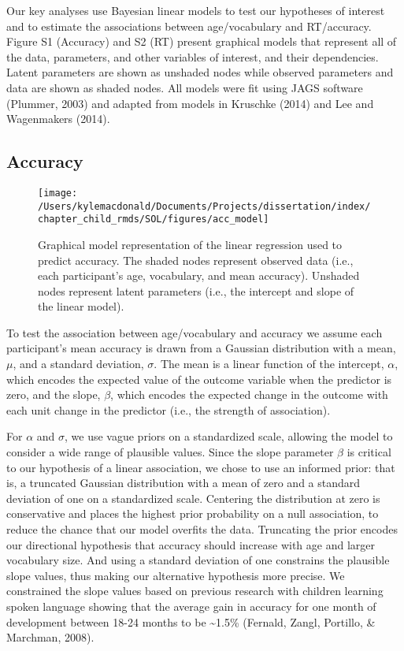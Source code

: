 \documentclass[oneside]{report}
\begin{document}
Our key analyses use Bayesian linear models to test our hypotheses of
interest and to estimate the associations between age/vocabulary and
RT/accuracy. Figure S1 (Accuracy) and S2 (RT) present graphical models
that represent all of the data, parameters, and other variables of
interest, and their dependencies. Latent parameters are shown as
unshaded nodes while observed parameters and data are shown as shaded
nodes. All models were fit using JAGS software (Plummer, 2003) and
adapted from models in Kruschke (2014) and Lee and Wagenmakers (2014).

\subsection{Accuracy}\label{accuracy}
\begin{figure}[!t]

{\centering \texttt{[image: /Users/kylemacdonald/Documents/Projects/dissertation/index/chapter\_child\_rmds/SOL/figures/acc\_model]} 

}

\caption[Graphical representation of the accuracy model in Experiment 1.1.]{Graphical model representation of the linear regression used to predict accuracy. The shaded nodes represent observed data (i.e., each participant's age, vocabulary, and mean accuracy). Unshaded nodes represent latent parameters (i.e., the intercept and slope of the linear model).}\label{fig:unnamed-chunk-8}
\end{figure}
To test the association between age/vocabulary and accuracy we assume
each participant's mean accuracy is drawn from a Gaussian distribution
with a mean, \(\mu\), and a standard deviation, \(\sigma\). The mean is
a linear function of the intercept, \(\alpha\), which encodes the
expected value of the outcome variable when the predictor is zero, and
the slope, \(\beta\), which encodes the expected change in the outcome
with each unit change in the predictor (i.e., the strength of
association).

For \(\alpha\) and \(\sigma\), we use vague priors on a standardized
scale, allowing the model to consider a wide range of plausible values.
Since the slope parameter \(\beta\) is critical to our hypothesis of a
linear association, we chose to use an informed prior: that is, a
truncated Gaussian distribution with a mean of zero and a standard
deviation of one on a standardized scale. Centering the distribution at
zero is conservative and places the highest prior probability on a null
association, to reduce the chance that our model overfits the data.
Truncating the prior encodes our directional hypothesis that accuracy
should increase with age and larger vocabulary size. And using a
standard deviation of one constrains the plausible slope values, thus
making our alternative hypothesis more precise. We constrained the slope
values based on previous research with children learning spoken language
showing that the average gain in accuracy for one month of development
between 18-24 months to be \textasciitilde{}1.5\% (Fernald, Zangl,
Portillo, \& Marchman, 2008).
\end{document}
